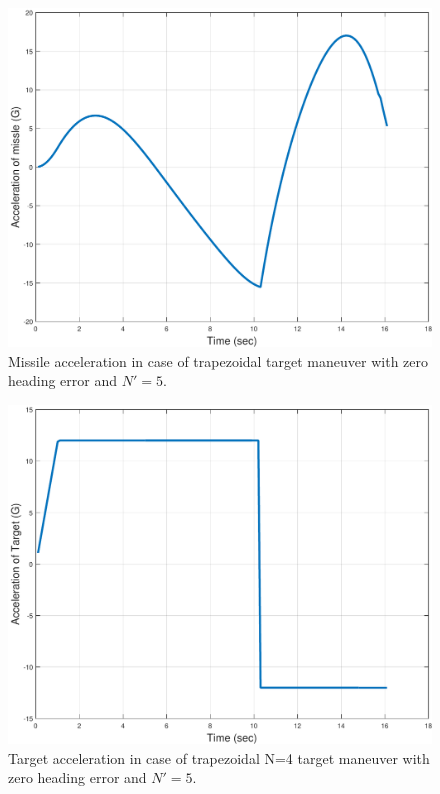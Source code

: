\begin{figure}[htb]
	\centering
	\includegraphics[scale = 0.35]{fig/MissileAccelerationTrap.pdf}
	\caption{Missile acceleration in case of trapezoidal target maneuver with zero heading error and $N'=5$.}
	\label{missile acceleration trap}
\end{figure}

\begin{figure}[H]
	\centering
	\includegraphics[scale = 0.35]{fig/TargetAccelerationTrap.pdf}
	\caption{Target acceleration in case of trapezoidal N=4 target maneuver with zero heading error and $N'=5$.}
	\label{Target acceleration trap}
\end{figure}

